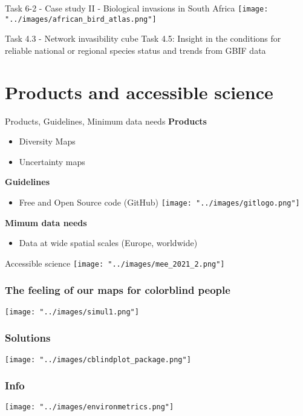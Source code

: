 \documentclass{beamer}
\begin{document}
\begin{frame}{Task 6-2 - Case study II - Biological invasions in South Africa}
\centering
\texttt{[image: "../images/african\_bird\_atlas.png"]}

\smallskip
\scriptsize{Task 4.3 - Network invasibility cube}
\scriptsize{Task 4.5: Insight in the conditions for reliable national or regional species status and trends from GBIF data}
\end{frame}


\section{Products and accessible science}

\begin{frame}{Products, Guidelines, Minimum data needs}
\textbf{Products}
	\begin{itemize}
		\item Diversity Maps 
		\item Uncertainty maps 
	\end{itemize}
\textbf{Guidelines}
	\begin{itemize}
		\item Free and Open Source code (GitHub)  \texttt{[image: "../images/gitlogo.png"]}
	\end{itemize}
\textbf{Mimum data needs}
	\begin{itemize}
		\item Data at wide spatial scales (Europe, worldwide)
	\end{itemize}
\end{frame}

\begin{frame}{Accessible science}
\texttt{[image: "../images/mee\_2021\_2.png"]}
\end{frame}

\begin{frame}
\frametitle{The feeling of our maps for colorblind people}
\centering
\texttt{[image: "../images/simul1.png"]}\\
\end{frame}

\begin{frame}
\frametitle{Solutions}
\centering
\texttt{[image: "../images/cblindplot\_package.png"]}\\
\end{frame}

\begin{frame}\frametitle{Info}
\centering
\texttt{[image: "../images/environmetrics.png"]}\\
\end{frame}
\end{document}
